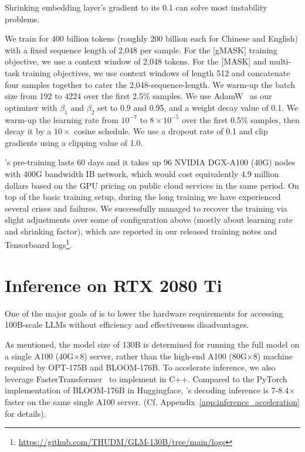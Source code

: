 {\begin{insight}
\rm Shrinking embedding layer's gradient to its 0.1 can solve most instability problems.
\end{insight}

We train \glm for 400 billion tokens (roughly 200 billion each for Chinese and English) with a fixed sequence length of 2,048 per sample. 
For the [gMASK] training objective, we use a context window of 2,048 tokens. 
For the [MASK] and multi-task training objectives, we use context windows of length 512 and concatenate four samples together to cater the 2,048-sequence-length. 
We warm-up the batch size from 192 to 4224 over the first 2.5\% samples. 
We use AdamW~\citep{loshchilov2017decoupled} as our optimizer with $\beta_1$ and $\beta_2$ set to 0.9 and 0.95, and a weight decay value of 0.1. 
We warm-up the learning rate from $10^{-7}$ to $8\times 10^{-5}$ over the first 0.5\% samples, then decay it by a $10\times$ cosine schedule. 
We use a dropout rate of 0.1 and clip gradients using a clipping value of 1.0.

\glm's pre-training lasts 60 days and it takes up 96 NVIDIA DGX-A100 (40G) nodes with 400G bandwidth IB network, which would cost equivalently 4.9 million dollars based on the GPU pricing on public cloud services in the same period.
On top of the basic training setup, during the long training we have experienced several crises and failures.
We successfully managed to recover the training via slight adjustments over some of configuration above (mostly about learning rate and shrinking factor), which are reported in our released training notes and Tensorboard logs\footnote{\url{https://github.com/THUDM/GLM-130B/tree/main/logs}}.

}%
\section{\glm Inference on RTX 2080 Ti}

One of the major goals of \glm is to lower the hardware requirements for accessing 100B-scale LLMs without efficiency and effectiveness disadvantages. 

As mentioned, the model size of 130B is determined for running the full \glm model on a single A100 (40G$\times$8) server, rather than the high-end A100 (80G$\times$8) machine required by OPT-175B and BLOOM-176B. 
To accelerate \glm inference, we also leverage FasterTransformer~\citep{timonin2022accelerated}
to implement \glm in C++.  
Compared to the PyTorch implementation of BLOOM-176B in Huggingface, \glm's decoding inference is 7-8.4$\times$ faster on the same single A100 server. (Cf. Appendix~\ref{app:inference_acceleration} for details).

